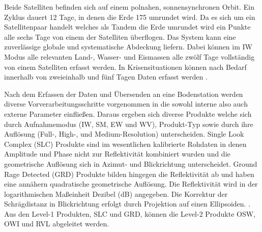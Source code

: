 Beide Satelliten befinden sich auf einem polnahen, sonnensynchronen Orbit. 
Ein Zyklus dauert 12 Tage, in denen die Erde 175 umrundet wird. 
Da es sich um ein Satellitenpaar handelt welches als Tandem die Erde umrundet wird ein Punkte alle sechs Tage von einem der Satelliten überflogen. Das System kann eine zuverlässige globale und systematische
Abdeckung liefern. Dabei können im IW Modus alle relevanten Land-, Wasser- und Eismassen alle zwölf Tage vollständig von einem Satelliten erfasst werden. 
In Krisensituationen können nach Bedarf innerhalb von zweieinhalb und fünf Tagen Daten erfasst werden \cite{sentinel_1_overview}. 

Nach dem Erfassen der Daten und Übersenden an eine Bodenstation werden diverse Vorverarbeitungsschritte vorgenommen in die sowohl interne also auch externe
Parameter einfließen. Daraus ergeben sich diverse Produkte welche sich durch Aufnahmemodus (IW, SM, EW und WV), Produkt-Typ sowie durch ihre 
Auflösung (Full-, High-, und Medium-Resolution) unterscheiden. Single Look Complex (SLC) Produkte sind im wesentlichen kalibrierte Rohdaten in denen Amplitude und Phase nicht
zur Reflektivität kombiniert wurden und die geometrische Auflösung sich in Azimut- und Blickrichtung unterscheidet. Ground Rage Detected (GRD) Produkte bilden hingegen die 
Reflektivität ab und haben eine annähern quadratische geometrische Auflösung. Die Reflektivität wird in der logarithmischen Maßeinheit Dezibel (dB) angegeben. Die Korrektur 
der Schrägdistanz in Blickrichtung erfolgt durch Projektion auf einen Ellipsoiden. \cite{sentinel_1_definition}. Aus den Level-1 Produkten, SLC und GRD, können die 
Level-2 Produkte OSW, OWI und RVL abgeleitet werden.

